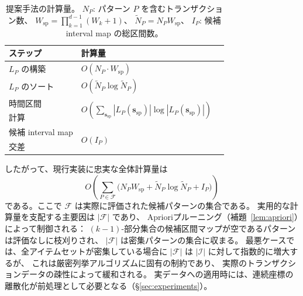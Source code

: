 \begin{table}[t]
\centering
\caption{提案手法の計算量。
$N_P$: パターン $P$ を含むトランザクション数、
$W_{\mathrm{sp}} = \prod_{k=1}^{d-1} (W_k + 1)$、
$\widetilde N_P = N_P W_{\mathrm{sp}}$、
$I_P$: 候補 interval map の総区間数。}
\label{tab:complexity}
\small
\begin{tabular}{lll}
\toprule
ステップ & 計算量 \\
\midrule
$L_P$ の構築 & $O(N_P \cdot W_{\mathrm{sp}})$ \\
$L_P$ のソート & $O(\widetilde N_P \log \widetilde N_P)$ \\
時間区間 & \multirow{2}{*}{$O\!\left(\sum_{\bm{s}_{\mathrm{sp}}}|L_P(\bm{s}_{\mathrm{sp}})| \log |L_P(\bm{s}_{\mathrm{sp}})|\right)$} \\
\quad 計算 & \\
候補 interval map & \multirow{2}{*}{$O(I_P)$} \\
\quad 交差 & \\
\bottomrule
\end{tabular}
\end{table}

したがって、現行実装に忠実な全体計算量は
\[
  O\!\left(
    \sum_{P \in \mathcal{F}}
      \bigl(
        N_P W_{\mathrm{sp}}
        +
        \widetilde N_P \log \widetilde N_P
        +
        I_P
      \bigr)
  \right)
\]
である。ここで $\mathcal{F}$ は実際に評価された候補パターンの集合である。
実用的な計算量を支配する主要因は $|\mathcal{F}|$ であり、
Aprioriプルーニング（補題~\ref{lem:apriori}）によって制御される：
$(k{-}1)$-部分集合の候補区間マップが空であるパターンは評価なしに枝刈りされ、
$|\mathcal{F}|$ は密集パターンの集合に収まる。
最悪ケースでは、全アイテムセットが密集している場合に $|\mathcal{F}|$ は $|\mathcal{I}|$ に対して指数的に増大するが、
これは厳密列挙アルゴリズムに固有の制約であり、
実際のトランザクションデータの疎性によって緩和される。
実データへの適用時には、連続座標の離散化が前処理として必要となる（\S\ref{sec:experiments}）。
